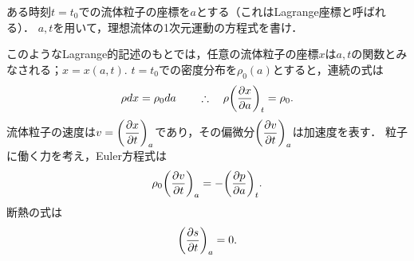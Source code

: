 
\begin{mondai}{}{}
ある時刻$t=t_0$での流体粒子の座標を$a$とする（これはLagrange座標と呼ばれる）．
$a,t$を用いて，理想流体の1次元運動の方程式を書け．
\end{mondai}

\begin{kaitou}
このようなLagrange的記述のもとでは，任意の流体粒子の座標$x$は$a,t$の関数とみなされる；$x=x(a,t).$
$t=t_0$での密度分布を$\rho_0(a)$とすると，連続の式は
\[
    \rho dx = \rho_0 da
    \qquad\yueni \rho \PDV{x}{a}{t} = \rho_0 .
\]
流体粒子の速度は$v = \dPDV{x}{t}{a}$であり，その偏微分$\dPDV{v}{t}{a}$は加速度を表す．
粒子に働く力を考え，Euler方程式は
\[
    \rho_0 \PDV{v}{t}{a} = - \PDV{p}{a}{t} .
\]
断熱の式は
\[
    \PDV{s}{t}{a} = 0 .
\]
\end{kaitou}




\BackToTheToc